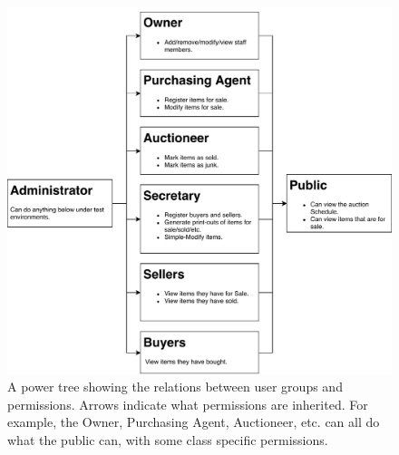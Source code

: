 \begin{figure}[H]
	\centering
	\includegraphics[scale=.75]{power_tree.pdf}
	\caption*{A power tree showing the relations between user groups and permissions. Arrows indicate what permissions are inherited. For example, the Owner, Purchasing Agent, Auctioneer, etc. can all do what the public can, with some class specific permissions.}
\end{figure}